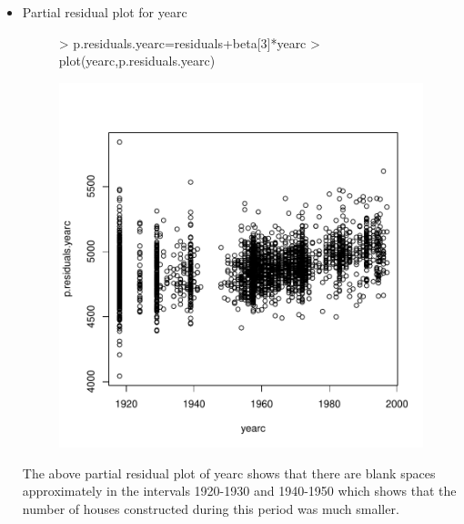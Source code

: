 \documentclass[12pt]{article}
\begin{document}
\begin{itemize}
\item Partial residual plot for yearc
\begin{figure}[H]
\begin{Schunk}
\begin{Sinput}
> p.residuals.yearc=residuals+beta[3]*yearc
> plot(yearc,p.residuals.yearc)
\end{Sinput}
\end{Schunk}
\includegraphics{HW3-034}
\end{figure}
\clearpage

The above partial residual plot of yearc shows that there are blank spaces approximately in the intervals 1920-1930 and 1940-1950 which shows that the number of houses constructed during this period was much smaller.


\end{itemize}
\end{document}
